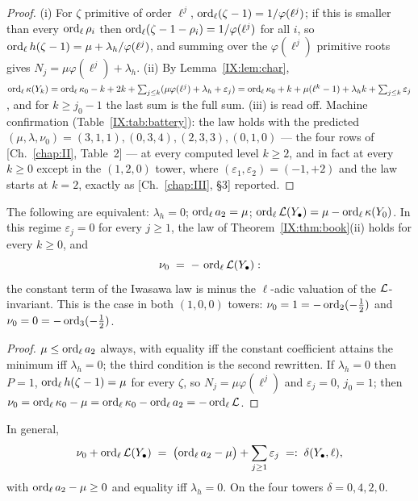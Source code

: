 \begin{proof}
(i) For $\zeta$ primitive of order $\ell^{j}$, $\operatorname{ord}_\ell(\zeta-1)=1/\varphi(\ell^{j})$;
if this is smaller than every $\operatorname{ord}_\ell\rho_i$ then
$\operatorname{ord}_\ell(\zeta-1-\rho_i)=1/\varphi(\ell^{j})$ for all $i$, so
$\operatorname{ord}_\ell h(\zeta-1)=\mu+\lambda_h/\varphi(\ell^{j})$, and summing over the
$\varphi(\ell^{j})$ primitive roots gives $N_j=\mu\varphi(\ell^{j})+\lambda_h$. (ii) By
Lemma~\ref{IX:lem:char},
$\operatorname{ord}_\ell\kappa(Y_k)=\operatorname{ord}_\ell\kappa_0-k+2k+\sum_{j\le k}(\mu\varphi(\ell^{j})
+\lambda_h+\varepsilon_j)=\operatorname{ord}_\ell\kappa_0+k+\mu(\ell^{k}-1)+\lambda_hk
+\sum_{j\le k}\varepsilon_j$, and for $k\ge j_0-1$ the last sum is the full sum. (iii)
is read off. Machine confirmation (Table~\ref{IX:tab:battery}): the law holds with the
predicted $(\mu,\lambda,\nu_0)=(3,1,1),(0,3,4),(2,3,3),(0,1,0)$ --- the four rows of
[Ch.~\ref{chap:II}, Table~2] --- at every computed level $k\ge2$, and in fact at every $k\ge0$ except
in the $(1,2,0)$ tower, where $(\varepsilon_1,\varepsilon_2)=(-1,+2)$ and the law
starts at $k=2$, exactly as [Ch.~\ref{chap:III}, \S3] reported.
\end{proof}

\begin{corollary}\label{IX:cor:regime}
The following are equivalent: $\lambda_h=0$; $\operatorname{ord}_\ell a_2=\mu$;
$\operatorname{ord}_\ell\mathcal{L}(Y_\bullet)=\mu-\operatorname{ord}_\ell\kappa(Y_0)$. In this regime $\varepsilon_j=0$ for
every $j\ge1$, the law of Theorem~\ref{IX:thm:book}(ii) holds for every $k\ge0$, and
\[
\nu_0\;=\;-\,\operatorname{ord}_\ell\mathcal{L}(Y_\bullet):
\]
the constant term of the Iwasawa law is minus the $\ell$-adic valuation of the
$\mathcal{L}$-invariant. This is the case in both $(1,0,0)$ towers: $\nu_0=1=-\operatorname{ord}_2(-\tfrac12)$
and $\nu_0=0=-\operatorname{ord}_3(-\tfrac12)$.
\end{corollary}

\begin{proof}
$\mu\le\operatorname{ord}_\ell a_2$ always, with equality iff the constant coefficient attains the
minimum iff $\lambda_h=0$; the third condition is the second rewritten. If $\lambda_h=0$
then $P=1$, $\operatorname{ord}_\ell h(\zeta-1)=\mu$ for every $\zeta$, so $N_j=\mu\varphi(\ell^{j})$
and $\varepsilon_j=0$, $j_0=1$; then $\nu_0=\operatorname{ord}_\ell\kappa_0-\mu
=\operatorname{ord}_\ell\kappa_0-\operatorname{ord}_\ell a_2=-\operatorname{ord}_\ell\mathcal{L}$.
\end{proof}

\begin{theorem}\label{IX:thm:defect}
In general,
\[
\nu_0+\operatorname{ord}_\ell\mathcal{L}(Y_\bullet)\;=\;\bigl(\operatorname{ord}_\ell a_2-\mu\bigr)+\sum_{j\ge1}\varepsilon_j
\;=:\;\delta(Y_\bullet,\ell),
\]
with $\operatorname{ord}_\ell a_2-\mu\ge0$ and equality iff $\lambda_h=0$. On the four towers
$\delta=0,4,2,0$.
\end{theorem}

